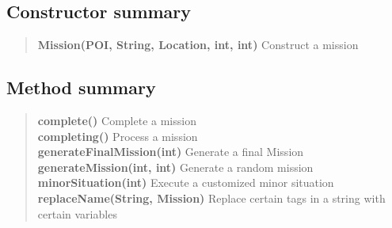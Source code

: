 {{{{{\subsection{Constructor summary}{
\begin{verse}
{\bf Mission(POI, String, Location, int, int)} Construct a mission\\
\end{verse}
}
\subsection{Method summary}{
\begin{verse}
{\bf complete()} Complete a mission\\
{\bf completing()} Process a mission\\
{\bf generateFinalMission(int)} Generate a final Mission\\
{\bf generateMission(int, int)} Generate a random mission\\
{\bf minorSituation(int)} Execute a customized minor situation\\
{\bf replaceName(String, Mission)} Replace certain tags in a string with certain variables\\
\end{verse}
}
}}}}}

